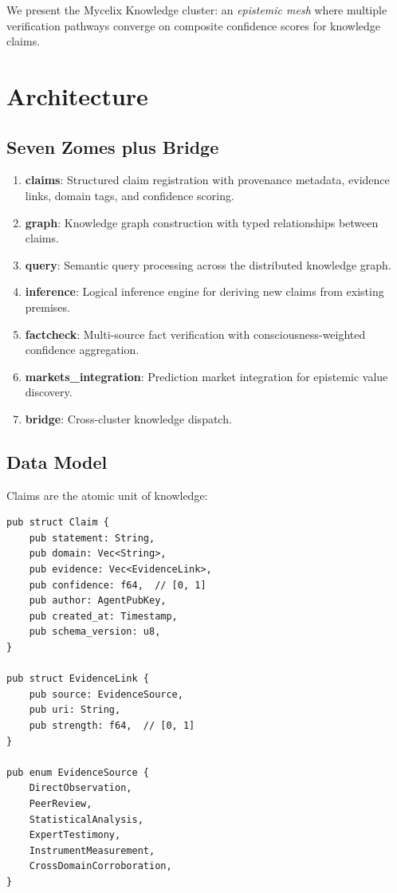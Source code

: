 \documentclass[11pt,twocolumn]{article}
\begin{document}
We present the Mycelix Knowledge cluster: an \emph{epistemic mesh} where
multiple verification pathways converge on composite confidence scores for
knowledge claims.

\section{Architecture}

\subsection{Seven Zomes plus Bridge}

\begin{enumerate}[nosep]
  \item \textbf{claims}: Structured claim registration with provenance
    metadata, evidence links, domain tags, and confidence scoring.
  \item \textbf{graph}: Knowledge graph construction with typed
    relationships between claims.
  \item \textbf{query}: Semantic query processing across the distributed
    knowledge graph.
  \item \textbf{inference}: Logical inference engine for deriving new
    claims from existing premises.
  \item \textbf{factcheck}: Multi-source fact verification with
    consciousness-weighted confidence aggregation.
  \item \textbf{markets\_integration}: Prediction market integration for
    epistemic value discovery.
  \item \textbf{bridge}: Cross-cluster knowledge dispatch.
\end{enumerate}

\subsection{Data Model}

Claims are the atomic unit of knowledge:

\begin{lstlisting}
pub struct Claim {
    pub statement: String,
    pub domain: Vec<String>,
    pub evidence: Vec<EvidenceLink>,
    pub confidence: f64,  // [0, 1]
    pub author: AgentPubKey,
    pub created_at: Timestamp,
    pub schema_version: u8,
}

pub struct EvidenceLink {
    pub source: EvidenceSource,
    pub uri: String,
    pub strength: f64,  // [0, 1]
}

pub enum EvidenceSource {
    DirectObservation,
    PeerReview,
    StatisticalAnalysis,
    ExpertTestimony,
    InstrumentMeasurement,
    CrossDomainCorroboration,
}
\end{lstlisting}
\end{document}
